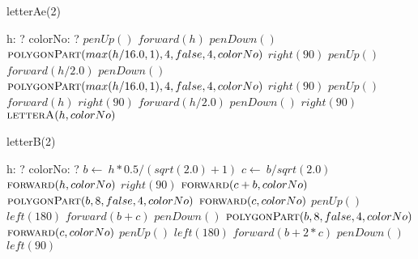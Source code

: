 \documentclass[a4paper,10pt]{article}
\begin{document}
\begin{algorithm}
\caption{letterAe(2)}
\begin{algorithmic}[5]
\State {}
\State {}
    \State h: ?
    \State colorNo: ?
  \EndDecl
  \State \(penUp()\)
  \State \(forward(h)\)
  \State \(penDown()\)
  \State {}
  \State {}
  \State \(\Call{polygonPart}{max(h/16.0,1),4,false,4,colorNo}\)
  \State \(right(90)\)
  \State \(penUp()\)
  \State \(forward(h/2.0)\)
  \State \(penDown()\)
  \State {}
  \State {}
  \State \(\Call{polygonPart}{max(h/16.0,1),4,false,4,colorNo}\)
  \State \(right(90)\)
  \State \(penUp()\)
  \State \(forward(h)\)
  \State \(right(90)\)
  \State \(forward(h/2.0)\)
  \State \(penDown()\)
  \State \(right(90)\)
  \State \(\Call{letterA}{h,colorNo}\)
\EndProcedure
\end{algorithmic}
\end{algorithm}


\begin{algorithm}
\caption{letterB(2)}
\begin{algorithmic}[5]
\State {}
\State {}
    \State h: ?
    \State colorNo: ?
  \EndDecl
  \State \(b\gets\ h*0.5/(sqrt(2.0)+1)\)
  \State \(c\gets\ b/sqrt(2.0)\)
  \State \(\Call{forward}{h,colorNo}\)
  \State \(right(90)\)
  \State \(\Call{forward}{c+b,colorNo}\)
  \State \(\Call{polygonPart}{b,8,false,4,colorNo}\)
  \State \(\Call{forward}{c,colorNo}\)
  \State \(penUp()\)
  \State \(left(180)\)
  \State \(forward(b+c)\)
  \State \(penDown()\)
  \State \(\Call{polygonPart}{b,8,false,4,colorNo}\)
  \State \(\Call{forward}{c,colorNo}\)
  \State \(penUp()\)
  \State \(left(180)\)
  \State \(forward(b+2*c)\)
  \State \(penDown()\)
  \State \(left(90)\)
\EndProcedure
\end{algorithmic}
\end{algorithm}
\end{document}
